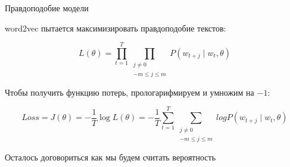 \documentclass[notes,12pt, aspectratio=169]{beamer}
\newenvironment{wideitemize}{\itemize\addtolength{\itemsep}{10pt}}{\enditemize}
\begin{document}
\begin{frame}{Правдоподобие модели}
	\begin{wideitemize} 
			\item  word2vec пытается максимизировать правдоподобие текстов:
			
				\[ 
					L(\theta)  = \prod_{t = 1}^T \prod_{ \substack{ j \ne 0 \\ -m \le j \le m}} P(w_{t + j} \mid w_t, \theta)
				\]
				
			\item Чтобы получить функцию потерь, прологарифмируем и умножим на $-1$:
			
				\[
					Loss = J(\theta) = - \frac{1}{T} \log L(\theta)  =  - \frac{1}{T} \sum_{t=1}^T  \sum_{ \substack{ j \ne 0 \\ -m \le j \le m}} log P(w_{t + j} \mid w_t, \theta)
				\]
				
			\item \alert{Осталось договориться как мы будем считать вероятность} 
		
		\end{wideitemize} 
\end{frame} 
\end{document}
